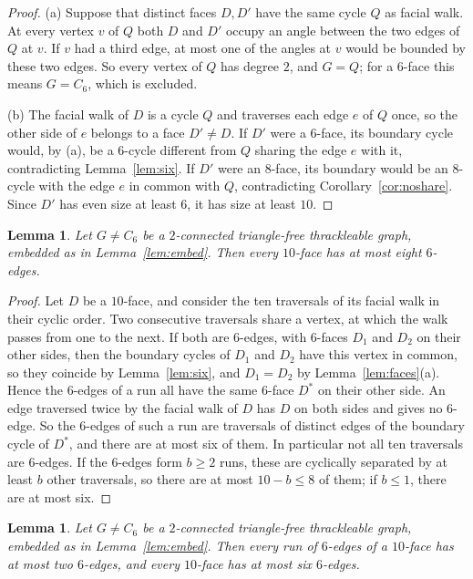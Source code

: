 \documentclass[11pt]{amsart}
\newtheorem{lemma}[theorem]{Lemma}
\theoremstyle{definition}
\theoremstyle{remark}
\numberwithin{equation}{section}
\begin{document}
\begin{proof}
(a) Suppose that distinct faces $D,D'$ have the same cycle $Q$ as facial walk. At every vertex $v$ of $Q$ both $D$ and $D'$ occupy an angle between the two edges of $Q$ at $v$. If $v$ had a third edge, at most one of the angles at $v$ would be bounded by these two edges. So every vertex of $Q$ has degree $2$, and $G=Q$; for a $6$-face this means $G=C_6$, which is excluded.

(b) The facial walk of $D$ is a cycle $Q$ and traverses each edge $e$ of $Q$ once, so the other side of $e$ belongs to a face $D'\ne D$. If $D'$ were a $6$-face, its boundary cycle would, by (a), be a $6$-cycle different from $Q$ sharing the edge $e$ with it, contradicting Lemma~\ref{lem:six}. If $D'$ were an $8$-face, its boundary would be an $8$-cycle with the edge $e$ in common with $Q$, contradicting Corollary~\ref{cor:noshare}. Since $D'$ has even size at least $6$, it has size at least $10$.
\end{proof}

\begin{lemma}\label{lem:ten}
Let $G\ne C_6$ be a $2$-connected triangle-free thrackleable graph, embedded as in Lemma~\ref{lem:embed}. Then every $10$-face has at most eight $6$-edges.
\end{lemma}

\begin{proof}
Let $D$ be a $10$-face, and consider the ten traversals of its facial walk in their cyclic order. Two consecutive traversals share a vertex, at which the walk passes from one to the next. If both are $6$-edges, with $6$-faces $D_1$ and $D_2$ on their other sides, then the boundary cycles of $D_1$ and $D_2$ have this vertex in common, so they coincide by Lemma~\ref{lem:six}, and $D_1=D_2$ by Lemma~\ref{lem:faces}(a). Hence the $6$-edges of a run all have the same $6$-face $D^*$ on their other side. An edge traversed twice by the facial walk of $D$ has $D$ on both sides and gives no $6$-edge. So the $6$-edges of such a run are traversals of distinct edges of the boundary cycle of $D^*$, and there are at most six of them. In particular not all ten traversals are $6$-edges. If the $6$-edges form $b\ge2$ runs, these are cyclically separated by at least $b$ other traversals, so there are at most $10-b\le8$ of them; if $b\le1$, there are at most six.
\end{proof}
\begin{lemma}\label{lem:runs}
Let $G\ne C_6$ be a $2$-connected triangle-free thrackleable graph, embedded as in Lemma~\ref{lem:embed}. Then every run of $6$-edges of a $10$-face has at most two $6$-edges, and every $10$-face has at most six $6$-edges.
\end{lemma}
\end{document}
